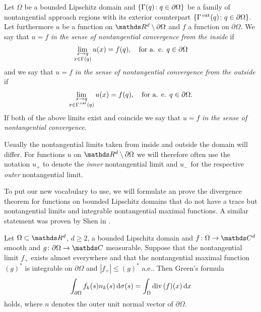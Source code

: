 \begin{defn}
  Let $\Omega$ be a bounded Lipschitz domain and $\{\Gamma(q) \colon q \in \partial\Omega\}$ be a family of nontangential approach regions with its exterior counterpart $\{\Gamma^{\,\mathrm{ext}}(q) \colon q \in \partial\Omega\}$.
  Let furthermore $u$ be a function on $\R^d \setminus \partial\Omega$ and $f$ a function on $\partial\Omega$.
  We say that $u = f$ \emph{in the sense of nontangential convergence from the inside} if 
  \begin{align*}
    \lim_{\substack{ x \to q \\ x \in \Gamma(q)}} u(x) = f(q), \quad\text{for a. e. } q \in \partial\Omega
  \end{align*}
  and we say that $u = f$ \emph{in the sense of nontangential convergence from the outside} if 
  \begin{align*}
    \lim_{\substack{ x \to q \\ x \in \Gamma^{\,\mathrm{ext}}(q)}} u(x) = f(q), \quad\text{for a. e. } q \in \partial\Omega.
  \end{align*}
  If both of the above limits exist and coincide we say that $u = f$ \emph{in the sense of nontangential convergence}.
\end{defn}

Usually the nontangential limits taken from inside and outside the domain will differ.
For functions $u$ on $\R^d \setminus \partial\Omega$ we will therefore often use the notation $u_+$ to denote the \emph{inner} nontangential limit and $u_-$ for the respective \emph{outer} nontangential limit.

To put our new vocabulary to use, we will formulate an prove the divergence theorem for functions on bounded Lipschitz domains that do not have a trace but nontangential limits and integrable nontangential maximal functions. A similar statement was proven by Shen in \cite[Thm. 7.1.6]{Shen2017}.

\begin{prop}
  \label{prop:approximationArgument}
  Let $\Omega \subset \R^d$, $d \geq 2$, a bounded Lipschitz domain and $f \colon \Omega \to \C^d$ smooth and $g \colon \partial\Omega \to \C$ measurable.
  Suppose that the nontangential limit $f_+$ exists almost everywhere and that the nontangential maximal function $(g)^*$ is integrable on $\partial\Omega$ and $|f_+| \leq (g)^*$ a.e..
  Then Green's formula
  \begin{align}
    \int_{\partial\Omega} f_k(s) n_k(s) \, {\operatorname{d}\!{\sigma}}(s) = \int_\Omega \mathrm{div\,} (f)(x) \, {\operatorname{d}\!{x}}
  \end{align}
  holds, where $n$ denotes the outer unit normal vector of $\partial\Omega$.
\end{prop}

